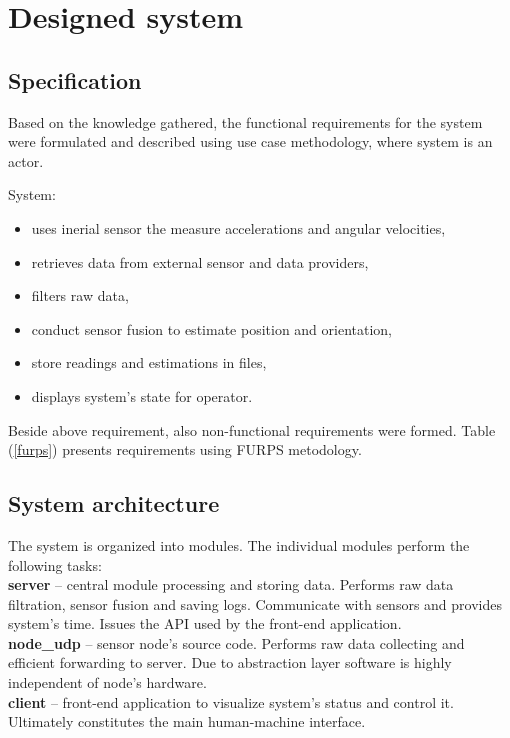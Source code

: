 \chapter{Designed system}

\section{Specification}

Based on the knowledge gathered, the functional requirements for the system were formulated and described using use case methodology, where system is an actor.

System:
\begin{itemize}
	\item uses inerial sensor the measure accelerations and angular velocities,
	\item retrieves data from external sensor and data providers,
	\item filters raw data,
	\item conduct sensor fusion to estimate position and orientation,
	\item store readings and estimations in files,
	\item displays system's state for operator.
\end{itemize}

Beside above requirement, also non-functional requirements were formed. Table (\ref{furps}) presents requirements using FURPS metodology.

\section{System architecture}

The system is organized into modules. The individual modules perform the following tasks:\\

\noindent\textbf{server} -- central module processing and storing data. Performs raw data filtration, sensor fusion and saving logs. Communicate with sensors and provides system's time. Issues the API used by the front-end application.\\

\noindent\textbf{node\_udp} -- sensor node's source code. Performs raw data collecting and efficient forwarding to server. Due to abstraction layer software is highly independent of  node's hardware.\\

\noindent\textbf{client} -- front-end application to visualize system's status and control it. Ultimately constitutes the main human-machine interface.\\

